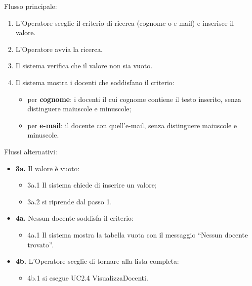 \noindent Flusso principale:
\begin{enumerate}
\item L'Operatore sceglie il criterio di ricerca (cognome o e-mail) e inserisce il valore.
\item L'Operatore avvia la ricerca.
\item Il sistema verifica che il valore non sia vuoto.
\item Il sistema mostra i docenti che soddisfano il criterio:
\begin{itemize}
\item per \textbf{cognome}: i docenti il cui cognome contiene il testo inserito, senza distinguere maiuscole e minuscole;
\item per \textbf{e-mail}: il docente con quell'e-mail, senza distinguere maiuscole e minuscole.
\end{itemize}
\end{enumerate}
\noindent Flussi alternativi:
\begin{itemize}
\item \textbf{3a.} Il valore è vuoto:
\begin{itemize}
\item 3a.1 Il sistema chiede di inserire un valore;
\item 3a.2 si riprende dal passo 1.
\end{itemize}
\item \textbf{4a.} Nessun docente soddisfa il criterio:
\begin{itemize}
\item 4a.1 Il sistema mostra la tabella vuota con il messaggio ``Nessun docente trovato''.
\end{itemize}
\item \textbf{4b.} L'Operatore sceglie di tornare alla lista completa:
\begin{itemize}
\item 4b.1 si esegue UC2.4 VisualizzaDocenti.
\end{itemize}
\end{itemize}
